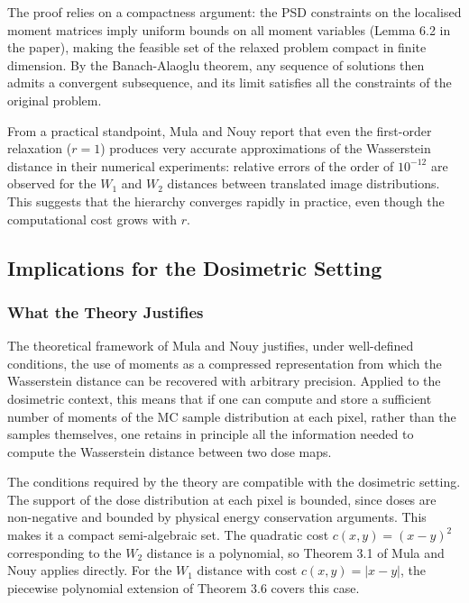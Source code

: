 \documentclass[12pt]{article}
\begin{document}
The proof relies on a compactness argument: the PSD constraints on the localised
moment matrices imply uniform bounds on all moment variables (Lemma 6.2 in the
paper), making the feasible set of the relaxed problem compact in finite dimension.
By the Banach-Alaoglu theorem, any sequence of solutions then admits a convergent
subsequence, and its limit satisfies all the constraints of the original problem.

From a practical standpoint, Mula and Nouy report that even the first-order
relaxation ($r = 1$) produces very accurate approximations of the Wasserstein
distance in their numerical experiments: relative errors of the order of $10^{-12}$
are observed for the $W_1$ and $W_2$ distances between translated image distributions.
This suggests that the hierarchy converges rapidly in practice, even though the
computational cost grows with $r$.

\subsection{Implications for the Dosimetric Setting}

\subsubsection{What the Theory Justifies}

The theoretical framework of Mula and Nouy justifies, under well-defined conditions,
the use of moments as a compressed representation from which the Wasserstein distance
can be recovered with arbitrary precision. Applied to the dosimetric context, this
means that if one can compute and store a sufficient number of moments of the MC
sample distribution at each pixel, rather than the samples themselves, one retains
in principle all the information needed to compute the Wasserstein distance between
two dose maps.

The conditions required by the theory are compatible with the dosimetric setting.
The support of the dose distribution at each pixel is bounded, since doses are
non-negative and bounded by physical energy conservation arguments. This makes it
a compact semi-algebraic set. The quadratic cost $c(x,y) = (x-y)^2$ corresponding
to the $W_2$ distance is a polynomial, so Theorem 3.1 of Mula and Nouy applies
directly. For the $W_1$ distance with cost $c(x,y) = |x-y|$, the piecewise
polynomial extension of Theorem 3.6 covers this case.
\end{document}
